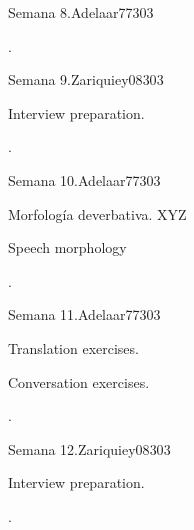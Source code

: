 \begin{syllabus}
\begin{unit}{Semana 8.}{}{Adelaar77}{30}{3}
   \begin{learningoutcomes}
      \item .
   \end{learningoutcomes}
\end{unit}

\begin{unit}{Semana 9.}{}{Zariquiey08}{30}{3}
   \begin{topics}
      \item Interview preparation.
   \end{topics}

   \begin{learningoutcomes}
      \item .
   \end{learningoutcomes}
\end{unit}

\begin{unit}{Semana 10.}{}{Adelaar77}{30}{3}
   \begin{topics}
      \item Morfología deverbativa. XYZ
      \item Speech morphology
   \end{topics}

   \begin{learningoutcomes}
      \item .
   \end{learningoutcomes}
\end{unit}

\begin{unit}{Semana 11.}{}{Adelaar77}{30}{3}
   \begin{topics}
      \item Translation exercises.
      \item Conversation exercises.
   \end{topics}

   \begin{learningoutcomes}
      \item . 
   \end{learningoutcomes}
\end{unit}

\begin{unit}{Semana 12.}{}{Zariquiey08}{30}{3}
   \begin{topics}
      \item Interview preparation.
   \end{topics}

   \begin{learningoutcomes}
      \item .
   \end{learningoutcomes}
\end{unit}


\end{syllabus}
